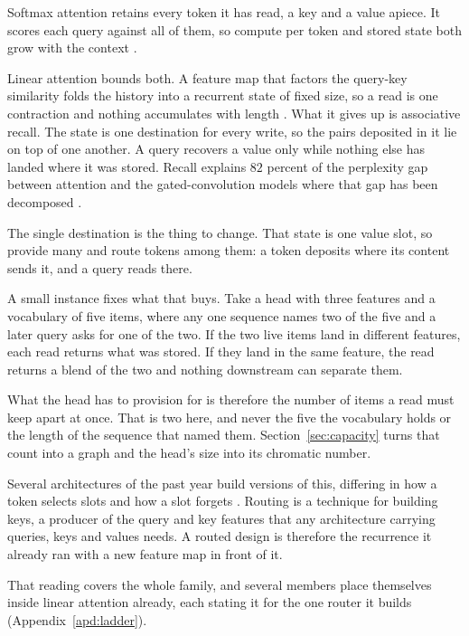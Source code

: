 Softmax attention retains every token it has read, a key and a value apiece. It scores each query against all of them, so compute per token and stored state both grow with the context \citep{vaswani2017}.

Linear attention bounds both. A feature map that factors the query-key similarity folds the history into a recurrent state of fixed size, so a read is one contraction and nothing accumulates with length \citep{katharopoulos2020}. What it gives up is associative recall. The state is one destination for every write, so the pairs deposited in it lie on top of one another. A query recovers a value only while nothing else has landed where it was stored. Recall explains $82$ percent of the perplexity gap between attention and the gated-convolution models where that gap has been decomposed \citep{arora2023zoology}.

The single destination is the thing to change. That state is one value slot, so provide many and route tokens among them: a token deposits where its content sends it, and a query reads there.

A small instance fixes what that buys. Take a head with three features and a vocabulary of five items, where any one sequence names two of the five and a later query asks for one of the two. If the two live items land in different features, each read returns what was stored. If they land in the same feature, the read returns a blend of the two and nothing downstream can separate them.

What the head has to provision for is therefore the number of items a read must keep apart at once. That is two here, and never the five the vocabulary holds or the length of the sequence that named them. Section~\ref{sec:capacity} turns that count into a graph and the head's size into its chromatic number.

Several architectures of the past year build versions of this, differing in how a token selects slots and how a slot forgets \citep{afzal2026raven, xiao2026ramnet, du2025mom, sse2025, cabannes2026sdm}. Routing is a technique for building keys, a producer of the query and key features that any architecture carrying queries, keys and values needs. A routed design is therefore the recurrence it already ran with a new feature map in front of it.

That reading covers the whole family, and several members place themselves inside linear attention already, each stating it for the one router it builds \citep{sse2025} (Appendix~\ref{apd:ladder}).

